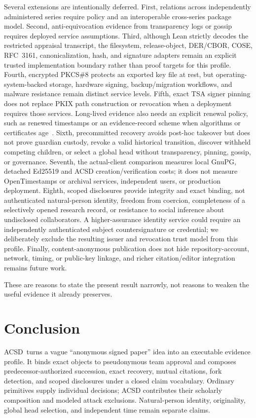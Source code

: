 \documentclass[conference,compsoc]{IEEEtran}
\newcommand{\acsd}{\textsc{ACSD}}
\begin{document}
Several extensions are intentionally deferred. First, relations across independently administered series require policy and an interoperable cross-series package model. Second, anti-equivocation evidence from transparency logs or gossip requires deployed service assumptions. Third, although Lean strictly decodes the restricted appraisal transcript, the filesystem, release-object, DER/CBOR, COSE, RFC~3161, canonicalization, hash, and signature adapters remain an explicit trusted implementation boundary rather than proof targets for this profile. Fourth, encrypted PKCS\#8 protects an exported key file at rest, but operating-system-backed storage, hardware signing, backup/migration workflows, and malware resistance remain distinct service levels. Fifth, exact TSA signer pinning does not replace PKIX path construction or revocation when a deployment requires those services. Long-lived evidence also needs an explicit renewal policy, such as renewed timestamps or an evidence-record scheme when algorithms or certificates age~\cite{ers}. Sixth, precommitted recovery avoids post-hoc takeover but does not prove guardian custody, revoke a valid historical transition, discover withheld competing children, or select a global head without transparency, pinning, gossip, or governance. Seventh, the actual-client comparison measures local GnuPG, detached Ed25519 and ACSD creation/verification costs; it does not measure OpenTimestamps or archival services, independent users, or production deployment. Eighth, scoped disclosures provide integrity and exact binding, not authenticated natural-person identity, freedom from coercion, completeness of a selectively opened research record, or resistance to social inference about undisclosed collaborators. A higher-assurance identity service could require an independently authenticated subject countersignature or credential; we deliberately exclude the resulting issuer and revocation trust model from this profile. Finally, content-anonymous publication does not hide repository-account, network, timing, or public-key linkage, and richer citation/editor integration remains future work.

These are reasons to state the present result narrowly, not reasons to weaken the useful evidence it already preserves.

\section{Conclusion}

\acsd\ turns a vague ``anonymous signed paper'' idea into an executable evidence profile. It binds exact objects to pseudonymous team approval and composes predecessor-authorized succession, exact recovery, mutual citations, fork detection, and scoped disclosures under a closed claim vocabulary. Ordinary primitives supply individual decisions; ACSD contributes their scholarly composition and modeled attack exclusions. Natural-person identity, originality, global head selection, and independent time remain separate claims.
\end{document}
